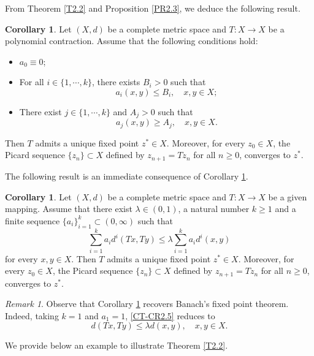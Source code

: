 \documentclass[letterpaper,12pt]{article}
\numberwithin{equation}{section}
\theoremstyle{definition}
\newtheorem{corollary}[theorem]{Corollary}
\theoremstyle{remark}
\newtheorem{remark}[theorem]{Remark}
\begin{document}
From Theorem \ref{T2.2} and Proposition \ref{PR2.3}, we deduce the following result. 

\begin{corollary}\label{CR2.4}
Let $(X,d)$ be a complete metric space and $T: X\to X$ be a polynomial contraction. Assume that the following conditions hold:
\begin{itemize}
\item[(i)] $a_0\equiv 0$;
\item[{\rm{(ii)}}] For all $i\in\{1,\cdots,k\}$, there exists 	$B_i>0$ such that 
$$
a_i(x,y)\leq B_i,\quad x,y\in X;
$$
\item[{\rm{(iii)}}] There exist $j\in\{1,\cdots,k\}$ and 	$A_j>0$ such that 
$$
a_j(x,y)\geq A_j,\quad x,y\in X.
$$
\end{itemize}
Then $T$ admits a unique fixed point $z^*\in X$. Moreover, for every $z_0\in X$, the Picard sequence  $\{z_n\}\subset X$ defined by $z_{n+1}=Tz_n$ for all $n\geq 0$, converges to $z^*$. 
\end{corollary}

The following result is an immediate consequence of Corollary \ref{CR2.4}. 


\begin{corollary}\label{CR2.5}
Let $(X,d)$ be a complete metric space and $T: X\to X$ be a given mapping. Assume that there exist $\lambda\in (0,1)$, a natural number $k\geq 1$ and a finite sequence $\{a_i\}_{i=1}^k\subset (0,\infty)$ such that 
\begin{equation}\label{CT-CR2.5}
\sum_{i=1}^ka_id^i(Tx,Ty)\leq \lambda \sum_{i=1}^k a_id^i(x,y)
\end{equation}
for every $x,y\in X$. Then  $T$ admits a unique fixed point $z^*\in X$. Moreover, for every $z_0\in X$, the Picard sequence  $\{z_n\}\subset X$ defined by $z_{n+1}=Tz_n$ for all $n\geq 0$, converges to $z^*$.   	
\end{corollary}

\begin{remark}
Observe that Corollary \ref{CR2.5} recovers Banach's fixed point theorem. 	Indeed, taking $k=1$ and $a_1=1$, \eqref{CT-CR2.5} reduces to 
$$
d(Tx,Ty)\leq \lambda d(x,y),\quad x,y\in X. 
$$
\end{remark}

We provide below an example to illustrate Theorem \ref{T2.2}.
\end{document}
